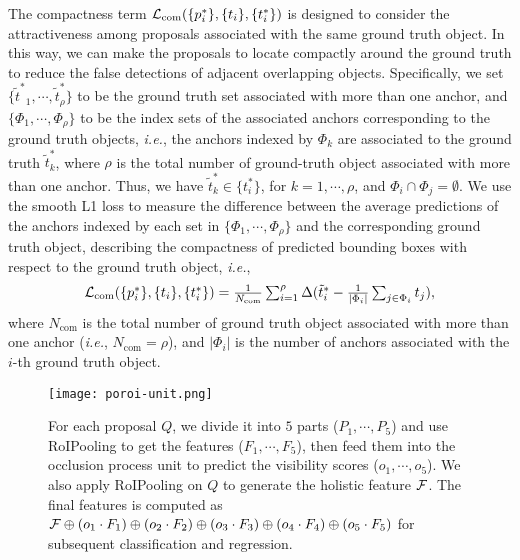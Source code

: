 \documentclass[runningheads]{llncs}
\def\ie{{\em i.e.}}
\begin{document}
The compactness term ${\cal L}_{\text{com}}(\{ p_i^\ast \}, \{t_i\}, \{t_i^\ast\})$ is designed to consider the attractiveness among proposals associated with the same ground truth object. In this way, we can make the proposals to locate compactly around the ground truth to reduce the false detections of adjacent overlapping objects. Specifically, we set $\{ {\tilde{t}^\ast}_1, \cdots, \tilde{t}^\ast_{\rho} \}$ to be the ground truth set associated with more than one anchor, and $\{ \Phi_1, \cdots, \Phi_{\rho} \}$ to be the index sets of the associated anchors corresponding to the ground truth objects, \ie, the anchors indexed by $\Phi_k$ are associated to the ground truth $\tilde{t}^\ast_k$, where $\rho$ is the total number of ground-truth object associated with more than one anchor. Thus, we have $\tilde{t}^\ast_k\in\{t_i^\ast\}$, for $k=1,\cdots,\rho$, and $\Phi_i\cap{\Phi_j}=\emptyset$. We use the smooth L1 loss to measure the difference between the average predictions of the anchors indexed by each set in $\{ \Phi_1, \cdots, \Phi_{\rho} \}$ and the corresponding ground truth object, describing the compactness of predicted bounding boxes with respect to the ground truth object, \ie,
\begin{equation}
\begin{array}{ll}
{\cal L}_{\text{com}}(\{ p_i^\ast \}, \{t_i\}, \{t_i^\ast\})=\frac{1}{N_{\text{com}}}\sum_{i=1}^{\rho}\Delta(\tilde{t}_i^\ast - \frac{1}{|\Phi_i|}\sum_{j\in{\Phi_i}}t_j),
\end{array}
\end{equation}
where $N_{\text{com}}$ is the total number of ground truth object associated with more than one anchor (\ie, $N_{\text{com}}=\rho$), and $|\Phi_i|$ is the number of anchors associated with the $i$-th ground truth object.


\begin{figure*}[t]
\centering
\texttt{[image: poroi-unit.png]}
\caption{For each proposal $Q$, we divide it into $5$ parts ($P_1, \cdots, P_5$) and use RoIPooling to get the features ($F_1, \cdots, F_5$), then feed them into the occlusion process unit to predict the visibility scores ($o_1, \cdots, o_5$). We also apply RoIPooling on $Q$ to generate the holistic feature ${\cal F}$. The final features is computed as ${\cal F} \oplus (o_1 \cdot F_1) \oplus (o_2 \cdot F_2) \oplus (o_3 \cdot F_3) \oplus (o_4 \cdot F_4) \oplus (o_5 \cdot F_5)$ for subsequent classification and regression.}
\label{fig:poroi-unit}
\end{figure*}
\end{document}

